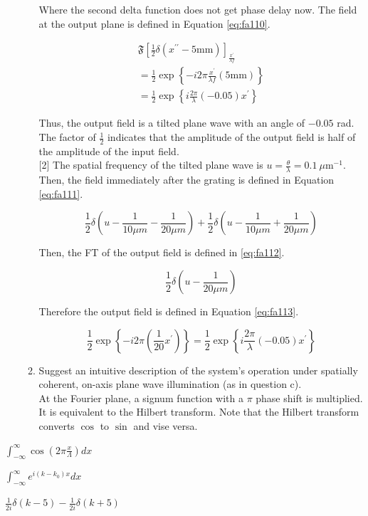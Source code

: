 \documentclass[main.tex]{subfiles}
\begin{document}
\begin{enumerate}
\begin{enumerate}
Where the second delta function does not get phase delay now. The field at the output plane is defined in Equation \ref{eq:fa110}.

\begin{equation}\label{eq:fa110}
\begin{aligned} 
\mathfrak{F}\left[\frac{1}{2} \delta\left(x^{\prime \prime}-5 \mathrm{mm}\right)\right]_{\frac{x^{\prime}}{\lambda f}}\\
=\frac{1}{2} \exp \left\{-i 2 \pi \frac{x^{\prime}}{\lambda f}(5 \mathrm{mm})\right\}\\
=\frac{1}{2} \exp \left\{i \frac{2 \pi}{\lambda}(-0.05) x^{\prime}\right\}
\end{aligned}
\end{equation}

Thus, the output field is a tilted plane wave with an angle of $-0.05$ rad. The factor of $\frac{1}{2}$ indicates that the amplitude of the output field is half of the amplitude of the input field.\\ 

[2] The spatial frequency of the tilted plane wave is $u = \frac{\theta}{\lambda} = \SI{0,1}{\mu \metre^{-1}}$. Then, the field immediately after the grating is defined in Equation \ref{eq:fa111}.

\begin{equation}\label{eq:fa111}
\frac{1}{2} \delta\left(u-\frac{1}{10 \mu m}-\frac{1}{20 \mu m}\right)+\frac{1}{2} \delta\left(u-\frac{1}{10 \mu m}+\frac{1}{20 \mu m}\right)
\end{equation}

Then, the FT of the output field is defined in \ref{eq:fa112}.

\begin{equation}\label{eq:fa112}
\frac{1}{2} \delta\left(u-\frac{1}{20 \mu m}\right)
\end{equation}

Therefore the output field is defined in Equation \ref{eq:fa113}.

\begin{equation}\label{eq:fa113}
\frac{1}{2} \exp \left\{-i 2 \pi\left(\frac{1}{20} x^{\prime}\right)\right\}=\frac{1}{2} \exp \left\{i \frac{2 \pi}{\lambda}(-0.05) x^{\prime}\right\}
\end{equation}

\item{Suggest an intuitive description of the system's operation under spatially coherent, on-axis plane wave illumination (as in question c)}.\\

At the  Fourier plane, a signum function with a $\pi$ phase shift is multiplied. It is equivalent to the Hilbert transform. Note that the Hilbert transform converts $\cos$ to $\sin$ and vise versa.

\end{enumerate}
\end{enumerate}

$\int_{-\infty}^{\infty} \cos(2\pi \frac{x}{\Lambda})dx$

$\int_{-\infty}^{\infty} e^{i(k-k_0)x}dx$

$\frac{1}{2i}\delta(k-5) - \frac{1}{2i}\delta(k+5)$
\end{document}
